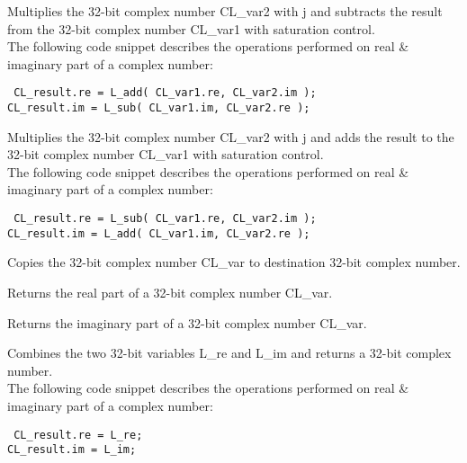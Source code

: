 
Multiplies the 32-bit complex number CL\_var2 with j and subtracts the result from the 32-bit complex number CL\_var1 with saturation control.\\
The following code snippet describes the operations performed on real \& imaginary part of a complex number:

{\tt {} CL\_result.re = L\_add( CL\_var1.re, CL\_var2.im );\\
      CL\_result.im = L\_sub( CL\_var1.im, CL\_var2.re );
}


Multiplies the 32-bit complex number CL\_var2 with j and adds the result to the 32-bit complex number CL\_var1 with saturation control.\\
The following code snippet describes the operations performed on real \& imaginary part of a complex number:

{\tt {} CL\_result.re = L\_sub( CL\_var1.re, CL\_var2.im );\\
      CL\_result.im = L\_add( CL\_var1.im, CL\_var2.re );
}


Copies the 32-bit complex number CL\_var to destination 32-bit complex number.


Returns the real part of a 32-bit complex number CL\_var.


Returns the imaginary part of a 32-bit complex number CL\_var.


Combines the two 32-bit variables L\_re and L\_im and returns a 32-bit complex number.\\
The following code snippet describes the operations performed on real \& imaginary part of a complex number:

{\tt {} CL\_result.re = L\_re;\\
      CL\_result.im = L\_im;
}

